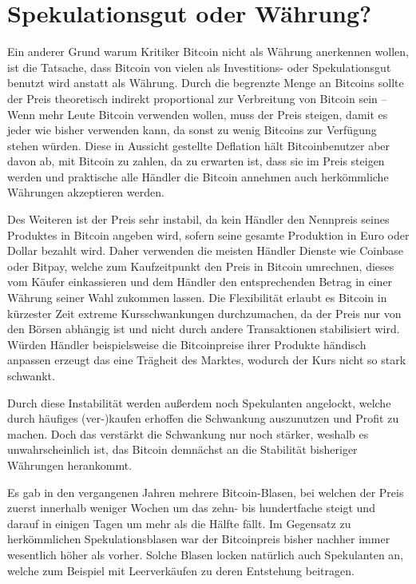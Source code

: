 \section{Spekulationsgut oder Währung?}
\label{sec:speculation}

Ein anderer Grund warum Kritiker Bitcoin nicht als Währung anerkennen wollen, ist die Tatsache, dass Bitcoin von vielen als Investitions- oder Spekulationsgut benutzt wird anstatt als Währung.
Durch die begrenzte Menge an Bitcoins sollte der Preis theoretisch indirekt proportional zur Verbreitung von Bitcoin sein -- Wenn mehr Leute Bitcoin verwenden wollen, muss der Preis steigen, damit es jeder wie bisher verwenden kann, da sonst zu wenig Bitcoins zur Verfügung stehen würden.
Diese in Aussicht gestellte Deflation hält Bitcoinbenutzer aber davon ab, mit Bitcoin zu zahlen, da zu erwarten ist, dass sie im Preis steigen werden und praktische alle Händler die Bitcoin annehmen auch herkömmliche Währungen akzeptieren werden.

Des Weiteren ist der Preis sehr instabil, da kein Händler den Nennpreis seines Produktes in Bitcoin angeben wird, sofern seine gesamte Produktion in Euro oder Dollar bezahlt wird.
Daher verwenden die meisten Händler Dienste wie Coinbase oder Bitpay, welche zum Kaufzeitpunkt den Preis in Bitcoin umrechnen, dieses vom Käufer einkassieren und dem Händler den entsprechenden Betrag in einer Währung seiner Wahl zukommen lassen.
Die Flexibilität erlaubt es Bitcoin in kürzester Zeit extreme Kursschwankungen durchzumachen, da der Preis nur von den Börsen abhängig ist und nicht durch andere Transaktionen stabilisiert wird.
Würden Händler beispielsweise die Bitcoinpreise ihrer Produkte händisch anpassen erzeugt das eine Trägheit des Marktes, wodurch der Kurs nicht so stark schwankt.

Durch diese Instabilität werden außerdem noch Spekulanten angelockt, welche durch häufiges (ver-)kaufen erhoffen die Schwankung auszunutzen und Profit zu machen.
Doch das verstärkt die Schwankung nur noch stärker, weshalb es unwahrscheinlich ist, das Bitcoin demnächst an die Stabilität bisheriger Währungen herankommt.

Es gab in den vergangenen Jahren mehrere Bitcoin-Blasen, bei welchen der Preis zuerst innerhalb weniger Wochen um das zehn- bis hundertfache steigt und darauf in einigen Tagen um mehr als die Hälfte fällt.
Im Gegensatz zu herkömmlichen Spekulationsblasen war der Bitcoinpreis bisher nachher immer wesentlich höher als vorher.
Solche Blasen locken natürlich auch Spekulanten an, welche zum Beispiel mit Leerverkäufen zu deren Entstehung beitragen.
